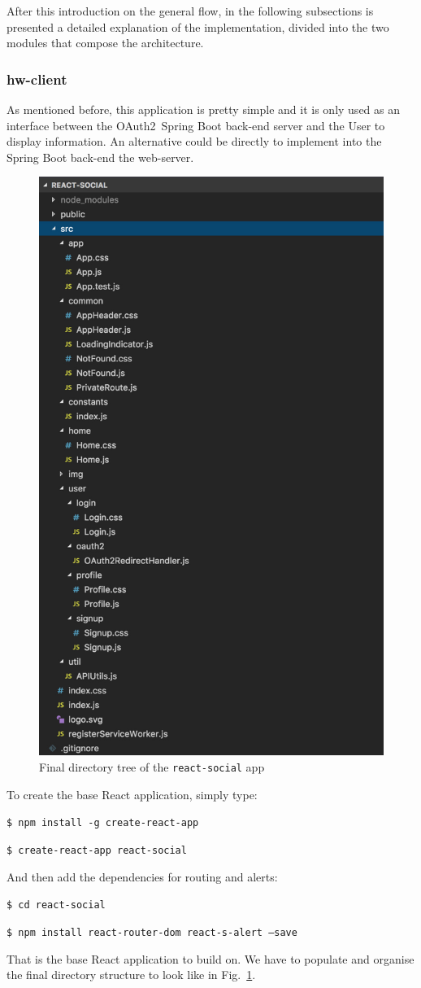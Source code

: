 \documentclass[a4paper,12pt]{article}
\def\oauth{OAuth2\xspace}
\def\myfig#1{Fig.~#1\xspace}
\begin{document}
After this introduction on the general flow, in the following subsections is presented a detailed explanation of the implementation, divided into the two modules that compose the architecture.

\subsubsection{hw-client}

As mentioned before, this application is pretty simple and it is only used as an interface between the \oauth\ Spring Boot back-end server and the User to display information. An alternative could be directly to implement into the Spring Boot back-end the web-server.

\begin{figure}[ht]
    \centering
    \includegraphics[width=0.30 \textwidth]{figures/dirreact.jpg}
    \caption{Final directory tree of the \texttt{react-social} app}
    \label{fig:dirtree}
\end{figure}

To create the base React application, simply type:

\quad \texttt{\$ npm install -g create-react-app}
  
\quad \texttt{\$ create-react-app react-social}

And then add the dependencies for routing and alerts:

\quad \texttt{\$ cd react-social}
  
\quad \texttt{\$ npm install react-router-dom react-s-alert --save}

That is the base React application to build on. We have to populate and organise the final directory structure to look like in \myfig{\ref{fig:dirtree}}.
\end{document}
